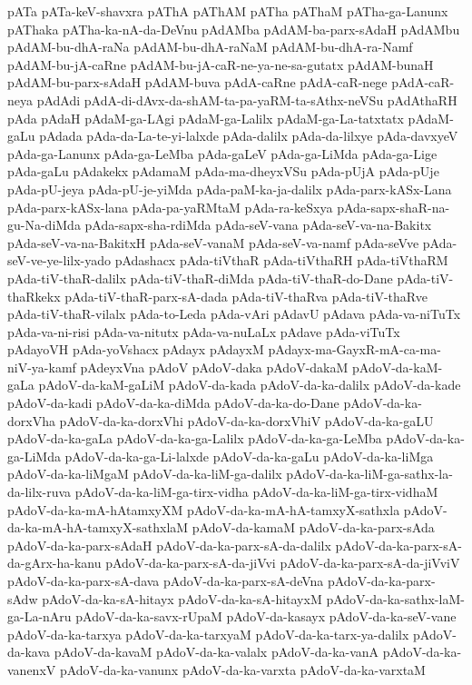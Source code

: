 {pATa
pATa-keV-shavxra
pAThA
pAThAM
pATha
pAThaM
pATha-ga-Lanunx
pAThaka
pATha-ka-nA-da-DeVnu
pAdAMba
pAdAM-ba-parx-sAdaH
pAdAMbu
pAdAM-bu-dhA-raNa
pAdAM-bu-dhA-raNaM
pAdAM-bu-dhA-ra-Namf
pAdAM-bu-jA-caRne
pAdAM-bu-jA-caR-ne-ya-ne-sa-gutatx
pAdAM-bunaH
pAdAM-bu-parx-sAdaH
pAdAM-buva
pAdA-caRne
pAdA-caR-nege
pAdA-caR-neya
pAdAdi
pAdA-di-dAvx-da-shAM-ta-pa-yaRM-ta-sAthx-neVSu
pAdAthaRH
pAda
pAdaH
pAdaM-ga-LAgi
pAdaM-ga-Lalilx
pAdaM-ga-La-tatxtatx
pAdaM-gaLu
pAdada
pAda-da-La-te-yi-lalxde
pAda-dalilx
pAda-da-lilxye
pAda-davxyeV
pAda-ga-Lanunx
pAda-ga-LeMba
pAda-gaLeV
pAda-ga-LiMda
pAda-ga-Lige
pAda-gaLu
pAdakekx
pAdamaM
pAda-ma-dheyxVSu
pAda-pUjA
pAda-pUje
pAda-pU-jeya
pAda-pU-je-yiMda
pAda-paM-ka-ja-dalilx
pAda-parx-kASx-Lana
pAda-parx-kASx-lana
pAda-pa-yaRMtaM
pAda-ra-keSxya
pAda-sapx-shaR-na-gu-Na-diMda
pAda-sapx-sha-rdiMda
pAda-seV-vana
pAda-seV-va-na-Bakitx
pAda-seV-va-na-BakitxH
pAda-seV-vanaM
pAda-seV-va-namf
pAda-seVve
pAda-seV-ve-ye-lilx-yado
pAdashacx
pAda-tiVthaR
pAda-tiVthaRH
pAda-tiVthaRM
pAda-tiV-thaR-dalilx
pAda-tiV-thaR-diMda
pAda-tiV-thaR-do-Dane
pAda-tiV-thaRkekx
pAda-tiV-thaR-parx-sA-dada
pAda-tiV-thaRva
pAda-tiV-thaRve
pAda-tiV-thaR-vilalx
pAda-to-Leda
pAda-vAri
pAdavU
pAdava
pAda-va-niTuTx
pAda-va-ni-risi
pAda-va-nitutx
pAda-va-nuLaLx
pAdave
pAda-viTuTx
pAdayoVH
pAda-yoVshacx
pAdayx
pAdayxM
pAdayx-ma-GayxR-mA-ca-ma-niV-ya-kamf
pAdeyxVna
pAdoV
pAdoV-daka
pAdoV-dakaM
pAdoV-da-kaM-gaLa
pAdoV-da-kaM-gaLiM
pAdoV-da-kada
pAdoV-da-ka-dalilx
pAdoV-da-kade
pAdoV-da-kadi
pAdoV-da-ka-diMda
pAdoV-da-ka-do-Dane
pAdoV-da-ka-dorxVha
pAdoV-da-ka-dorxVhi
pAdoV-da-ka-dorxVhiV
pAdoV-da-ka-gaLU
pAdoV-da-ka-gaLa
pAdoV-da-ka-ga-Lalilx
pAdoV-da-ka-ga-LeMba
pAdoV-da-ka-ga-LiMda
pAdoV-da-ka-ga-Li-lalxde
pAdoV-da-ka-gaLu
pAdoV-da-ka-liMga
pAdoV-da-ka-liMgaM
pAdoV-da-ka-liM-ga-dalilx
pAdoV-da-ka-liM-ga-sathx-la-da-lilx-ruva
pAdoV-da-ka-liM-ga-tirx-vidha
pAdoV-da-ka-liM-ga-tirx-vidhaM
pAdoV-da-ka-mA-hAtamxyXM
pAdoV-da-ka-mA-hA-tamxyX-sathxla
pAdoV-da-ka-mA-hA-tamxyX-sathxlaM
pAdoV-da-kamaM
pAdoV-da-ka-parx-sAda
pAdoV-da-ka-parx-sAdaH
pAdoV-da-ka-parx-sA-da-dalilx
pAdoV-da-ka-parx-sA-da-gArx-ha-kanu
pAdoV-da-ka-parx-sA-da-jiVvi
pAdoV-da-ka-parx-sA-da-jiVviV
pAdoV-da-ka-parx-sA-dava
pAdoV-da-ka-parx-sA-deVna
pAdoV-da-ka-parx-sAdw
pAdoV-da-ka-sA-hitayx
pAdoV-da-ka-sA-hitayxM
pAdoV-da-ka-sathx-laM-ga-La-nAru
pAdoV-da-ka-savx-rUpaM
pAdoV-da-kasayx
pAdoV-da-ka-seV-vane
pAdoV-da-ka-tarxya
pAdoV-da-ka-tarxyaM
pAdoV-da-ka-tarx-ya-dalilx
pAdoV-da-kava
pAdoV-da-kavaM
pAdoV-da-ka-valalx
pAdoV-da-ka-vanA
pAdoV-da-ka-vanenxV
pAdoV-da-ka-vanunx
pAdoV-da-ka-varxta
pAdoV-da-ka-varxtaM
}
